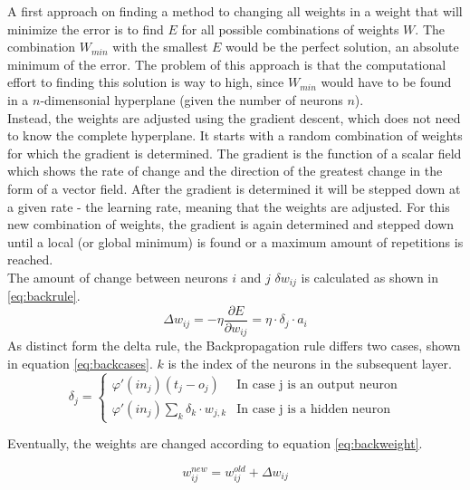 \documentclass[10pt,a4paper,DIV=11]{scrreprt}
\begin{document}
A first approach on finding a method to changing all weights in a weight that will minimize the error is to find $E$ for all possible combinations of weights $W$. The combination $W_{min}$ with the smallest $E$ would be the perfect solution, an absolute minimum of the error. The problem of this approach is that the computational effort to finding this solution is way to high, since $W_{min}$ would have to be found in a $n$-dimensonial  hyperplane (given the number of neurons $n$).\\

Instead, the weights are adjusted using the gradient descent, which does not need to know the complete hyperplane. It starts with a random combination of weights for which the gradient is determined. The gradient is the function of a scalar field which shows the rate of change and the direction of the greatest change in the form of a vector field. After the gradient is determined it will be stepped down at a given rate - the learning rate, meaning that the weights are adjusted. For this new combination of weights, the gradient is again determined and stepped down until a local (or global minimum) is found or a maximum amount of repetitions is reached.\\

The amount of change between neurons $i$ and $j$ $\delta w_{ij}$ is calculated as shown in \eqref{eq:backrule}.
\begin{equation}
\Delta w_{ij} = -\eta \frac{\partial E}{\partial w_{ij}} = \eta \cdot \delta_j \cdot a_i
\label{eq:backrule}
\end{equation}
As distinct form the delta rule, the Backpropagation rule differs two cases, shown in equation \eqref{eq:backcases}. $k$ is the index of the neurons in the subsequent layer.
\begin{equation}
   \delta_j =
   \begin{cases}
     \varphi'(in_j)(t_j-o_j) & \text{In case j is an output neuron} \\
     \varphi'(in_j)\sum_{k} \delta_k \cdot w_{j,k} & \text{In case j is a hidden neuron}
   \end{cases}
\label{eq:backcases}
\end{equation}

Eventually, the weights are changed according to equation \eqref{eq:backweight}.

\begin{equation}
   w_{ij}^{new} = w_{ij}^{old} + \Delta w_{ij}
\label{eq:backweight}
\end{equation}
\end{document}
